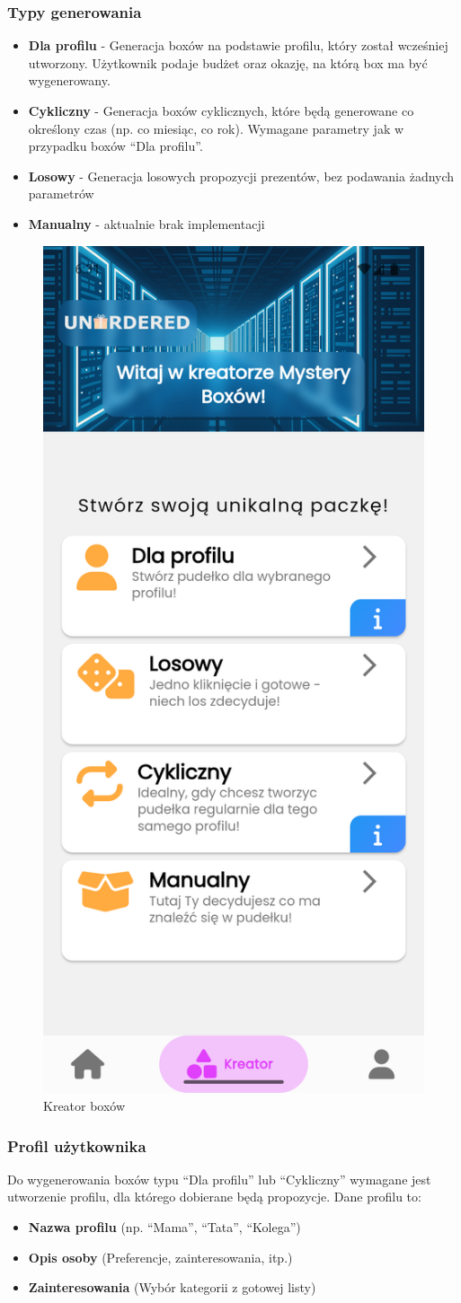 \documentclass[a4paper, 12pt]{article}
\begin{document}
\subsubsection{Typy generowania}
\begin{itemize}
    \item \textbf{Dla profilu} - Generacja boxów na podstawie profilu, który został wcześniej utworzony.
    Użytkownik podaje budżet oraz okazję, na którą box ma być wygenerowany.
    \item \textbf{Cykliczny} - Generacja boxów cyklicznych,
    które będą generowane co określony czas (np. co miesiąc, co rok).
    Wymagane parametry jak w przypadku boxów ``Dla profilu''.
    \item \textbf{Losowy} - Generacja losowych propozycji prezentów, bez podawania żadnych parametrów
    \item \textbf{Manualny} - aktualnie brak implementacji
\end{itemize}
\begin{figure}[H]
    \centering
    \includegraphics[width=0.3\linewidth,keepaspectratio]{images/box_creator.png}
    \caption{Kreator boxów}
    \label{fig:box-creator}
\end{figure}
\subsubsection{Profil użytkownika}
Do wygenerowania boxów typu ``Dla profilu'' lub ``Cykliczny'' wymagane jest utworzenie profilu, dla którego dobierane będą propozycje. Dane profilu to:
\begin{itemize}
    \item \textbf{Nazwa profilu} (np. ``Mama'', ``Tata'', ``Kolega'')
    \item \textbf{Opis osoby} (Preferencje, zainteresowania, itp.)
    \item \textbf{Zainteresowania} (Wybór kategorii z gotowej listy)
\end{itemize}
\end{document}
